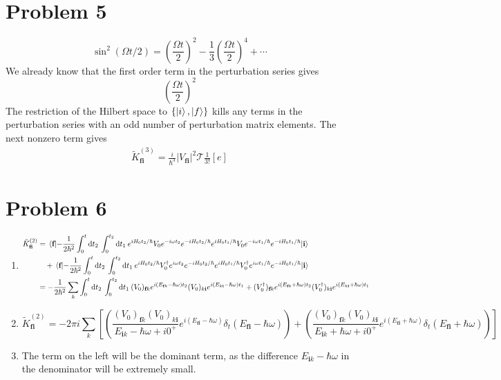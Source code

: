 \documentclass[12pt]{article}
\newcommand{\magsq}[1]{\big|#1\big|^2}
\newcommand{\cint}[2]{\int_{#1}^{#2}}
\newcommand{\cintd}[3]{\cint{#1}{#2}\dd#3\:}
\begin{document}
\section*{Problem 5}
\[ \sin^2(\Omega t/2) = \left(\frac{\Omega t}{2}\right)^2 - \frac{1}{3}\left(\frac{\Omega t}{2}\right)^4 + \cdots \]
We already know that the first order term in the perturbation series gives
\[ \left(\frac{\Omega t}{2}\right)^2 \]
The restriction of the Hilbert space to $\{\ket{i},\ket{f}\}$ kills any terms in the perturbation series with an odd number of perturbation matrix elements. The next nonzero term gives
\begin{align*}
    \tilde{K}_\textbf{fi}^{(3)} = \frac{i}{\hbar^3}\magsq{V_\textbf{fi}}\mathscr{T}\frac{1}{3!}\left[e\right]
\end{align*}

\section*{Problem 6}
\begin{enumerate}[label=(\alph*)]
    \item 
    \begin{align*}
        \tilde{K}_\textbf{fi}^{(2)} &= \mel{\textbf{f}}{-\frac{1}{2\hbar^2}\cintd{0}{t}{t_2}\cintd{0}{t_2}{t_1}e^{iH_0t_2/\hbar}V_0e^{-i\omega t_2}e^{-iH_0t_2/\hbar}e^{iH_0t_1/\hbar}V_0e^{-i\omega t_1/\hbar}e^{-iH_0t_1/\hbar} }{\textbf{i}} \\
        & \quad + \mel{\textbf{f}}{-\frac{1}{2\hbar^2}\cintd{0}{t}{t_2}\cintd{0}{t_2}{t_1}e^{iH_0t_2/\hbar}V_0^\dag e^{i\omega t_2}e^{-iH_0t_2/\hbar}e^{iH_0t_1/\hbar}V_0^\dag e^{i\omega t_1/\hbar}e^{-iH_0t_1/\hbar} }{\textbf{i}} \\
        &= -\frac{1}{2\hbar^2}\sum_k\cintd{0}{t}{t_2}\cintd{0}{t_2}{t_1}(V_0)_{\textbf{f}k}e^{i(E_{\textbf{f}k}-\hbar\omega)t_2}(V_0)_{k\textbf{i}}e^{i(E_{k\textbf{i}}-\hbar\omega)t_1} + (V_0^\dag)_{\textbf{f}k}e^{i(E_{\textbf{f}k}+\hbar\omega)t_2}(V_0^\dag)_{k\textbf{i}}e^{i(E_{k\textbf{i}}+\hbar\omega)t_1}
    \end{align*}

    \item
    \[ \tilde{K}_\textbf{fi}^{(2)} = -2\pi i \sum_k \left[\left(\frac{(V_0)_{\textbf{f}k}(V_0)_{k\textbf{i}}}{E_{\textbf{i}k}-\hbar\omega +i0^+}e^{i(E_\textbf{fi}-\hbar\omega)}\delta_t(E_\textbf{fi}-\hbar\omega)\right)+\left(\frac{(V_0)_{\textbf{f}k}(V_0)_{k\textbf{i}}}{E_{\textbf{i}k}+\hbar\omega + i0^+}e^{i(E_\textbf{fi}+\hbar\omega)}\delta_t(E_\textbf{fi}+\hbar\omega)\right)\right] \]

    \item
    The term on the left will be the dominant term, as the difference $E_{\mathbf{i}k} - \hbar\omega$ in the denominator will be extremely small.
\end{enumerate}
\end{document}
